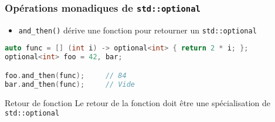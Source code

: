 \documentclass[C++.tex]{subfiles}
\begin{document}
\begin{frame}[fragile]
	\frametitle{Opérations monadiques de \lstinline|std::optional|}
	\begin{itemize}
		\item \lstinline|and_then()| dérive une fonction pour retourner un \lstinline|std::optional|
	\end{itemize}

	\begin{lstlisting}[language=C++]
auto func = [] (int i) -> optional<int> { return 2 * i; };
optional<int> foo = 42, bar;

foo.and_then(func);		// 84
bar.and_then(func);		// Vide\end{lstlisting}

	\begin{alertblock}{Retour de fonction}
		Le retour de la fonction doit être une spécialisation de \lstinline|std::optional|
	\end{alertblock}
\end{frame}
\end{document}
